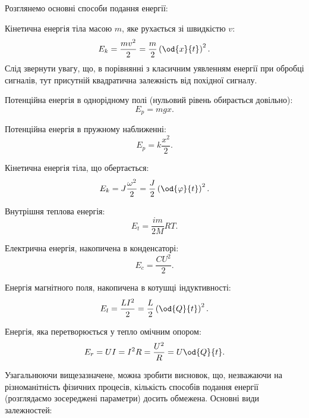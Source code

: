 Розглянемо основні способи подання енергії:

Кінетична енергія тіла масою $m$, яке рухається зі швидкістю $v$:
%
\begin{equation}
  E_k = \frac{mv^2}{2} = \frac{m}{2} \left( \od{x}{t} \right)^2.
  \label{atu:eq:Ek_v}
\end{equation}
%
Слід звернути увагу, що, в порівнянні з класичним уявленням
енергії при обробці сигналів, тут присутній квадратична
залежність від похідної сигналу.

Потенційна енергія в однорідному полі (нульовий рівень обирається довільно):
%
\begin{equation}
  E_p = m g x .
  \label{atu:eq:Ep_g}
\end{equation}

Потенційна енергія в пружному наближенні:
%
\begin{equation}
  E_p = k \frac{x^2}{2} .
  \label{atu:eq:Ep_spring}
\end{equation}

Кінетична енергія тіла, що обертається:
%
\begin{equation}
  E_k = J \frac{\omega^2}{2} = \frac{J}{2} \left( \od{\varphi}{t} \right)^2 .
  \label{atu:eq:Ek_spin}
\end{equation}

Внутрішня теплова енергія:
%
\begin{equation}
  E_t = \frac{im}{2M} RT.
  \label{atu:eq:Et}
\end{equation}

Електрична енергія, накопичена в конденсаторі:
%
\begin{equation}
  E_c = \frac{C U^2}{2}.
  \label{atu:eq:Ec}
\end{equation}

Енергія магнітного поля, накопичена в котушці індуктивності:
%
\begin{equation}
  E_l = \frac{L I^2}{2} = \frac{L}{2} \left( \od{Q}{t}\right)^2 .
  \label{atu:eq:El}
\end{equation}

Енергія, яка перетворюється у тепло омічним опором:
%
\begin{equation}
  E_r = U I = I^2 R = \frac{U^2}{R} = U \od{Q}{t} .
  \label{atu:eq:Er}
\end{equation}


%


Узагальнюючи вищезазначене, можна зробити висновок, що, незважаючи на
різноманітність фізичних процесів, кількість способів подання енергії
(розглядаємо зосереджені параметри) досить обмежена. Основні види залежностей:

